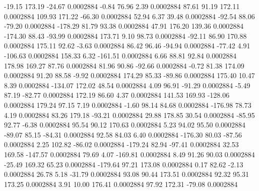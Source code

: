       -19.15      173.19      -24.67     0.0002884
       -0.84       76.96        2.39     0.0002884
       87.61       91.19      172.11     0.0002884
      109.93      171.22      -66.30     0.0002884
       52.94        6.37       39.48     0.0002884
      -92.54       88.06      -79.20     0.0002884
     -178.29       81.79       93.38     0.0002884
       47.91      176.20      139.36     0.0002884
     -174.30       88.43      -93.99     0.0002884
      173.71        9.10       98.73     0.0002884
      -92.11       86.90      170.88     0.0002884
      175.11       92.62       -3.63     0.0002884
       86.42       96.46      -94.94     0.0002884
      -77.42        4.91     -106.63     0.0002884
      158.33        6.32     -161.51     0.0002884
        6.66       88.81       92.84     0.0002884
      178.98      169.27       87.76     0.0002884
       81.96       90.86      -92.66     0.0002884
       -0.72       81.38      174.09     0.0002884
       91.20       88.58       -9.92     0.0002884
      174.29       85.33      -89.86     0.0002884
      175.40       10.47        8.39     0.0002884
     -134.07      172.02       48.54     0.0002884
        4.09       96.91      -91.29     0.0002884
       -5.49       87.19      -82.77     0.0002884
      172.19       86.60        4.37     0.0002884
      141.53      169.93     -128.06     0.0002884
      179.24       97.15        7.19     0.0002884
       -1.60       98.14       84.68     0.0002884
     -176.98       78.73        4.19     0.0002884
       83.26      179.18      -93.21     0.0002884
       29.88      178.85       30.54     0.0002884
      -85.95       92.77       -6.38     0.0002884
       95.54       90.12      170.63     0.0002884
        5.23       94.02       95.50     0.0002884
      -89.07       85.15      -84.31     0.0002884
       92.58       84.03        6.40     0.0002884
     -176.30       80.03      -87.56     0.0002884
        2.25      102.82      -86.02     0.0002884
     -179.24       82.94      -97.41     0.0002884
       32.53      169.58     -147.57     0.0002884
       79.69        4.07     -169.81     0.0002884
        8.49       91.26       90.03     0.0002884
      -25.49      169.32       65.23     0.0002884
     -179.64       97.21      173.08     0.0002884
        0.17       82.62       -2.13     0.0002884
       26.78        5.18      -31.79     0.0002884
       93.08       90.44      173.51     0.0002884
       92.32       95.31      173.25     0.0002884
        3.91       10.00      176.41     0.0002884
       97.92      172.31      -79.08     0.0002884

